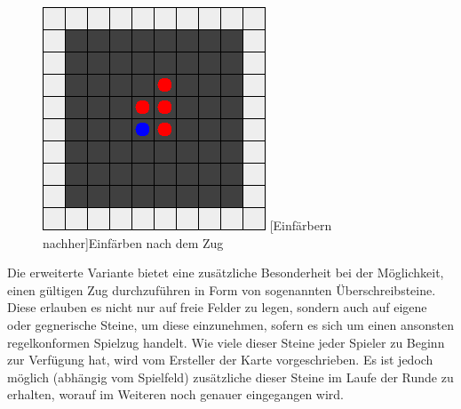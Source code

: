 \documentclass[12pt,a4paper,bibliography=totocnumbered,listof=totocnumbered]{article}
\begin{document}
\begin{figure}[H]
\begin{minipage}[c]{0.4\textwidth}
	\includegraphics[width=\textwidth]{pics/reversi_original_map_capture_2.png}
	[Einfärbern nachher]{Einfärben nach dem Zug}
	\label{fig:capture_post}
\end{minipage}
\end{figure}

Die erweiterte Variante bietet eine zusätzliche Besonderheit bei der Möglichkeit, einen gültigen Zug durchzuführen in Form von sogenannten Überschreibsteine. Diese erlauben es nicht nur auf freie Felder zu legen, sondern auch auf eigene oder gegnerische Steine, um diese einzunehmen, sofern es sich um einen ansonsten regelkonformen Spielzug handelt. Wie viele dieser Steine jeder Spieler zu Beginn zur Verfügung hat, wird vom Ersteller der Karte vorgeschrieben. Es ist jedoch möglich (abhängig vom Spielfeld) zusätzliche dieser Steine im Laufe der Runde zu erhalten, worauf im Weiteren noch genauer eingegangen wird. 
\end{document}
